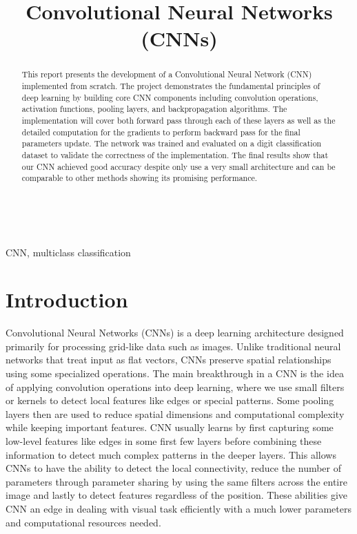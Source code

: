 \documentclass[conference]{IEEEtran}
\begin{document}
\title{Convolutional Neural Networks (CNNs)}\\

\author{
}

\maketitle
\thispagestyle{plain}
\pagestyle{plain}

\begin{abstract}
This report presents the development of a Convolutional Neural Network (CNN) implemented from scratch. The project demonstrates the fundamental principles of deep learning by building core CNN components including convolution operations, activation functions, pooling layers, and backpropagation algorithms. The implementation will cover both forward pass through each of these layers as well as the detailed computation for the gradients to perform backward pass for the final parameters update. The network was trained and evaluated on a digit classification dataset to validate the correctness of the implementation. The final results show that our CNN achieved good accuracy despite only use a very small architecture and can be comparable to other methods showing its promising performance.
\end{abstract}

\begin{IEEEkeywords}
CNN, multiclass classification
\end{IEEEkeywords}

\section{Introduction}
Convolutional Neural Networks (CNNs) is a deep learning architecture designed primarily for processing grid-like data such as images. Unlike traditional neural networks that treat input as flat vectors, CNNs preserve spatial relationships using some specialized operations. The main breakthrough in a CNN is the idea of applying convolution operations into deep learning, where we use small filters or kernels to detect local features like edges or special patterns. Some pooling layers then are used to reduce spatial dimensions and computational complexity while keeping important features. CNN usually learns by first capturing some low-level features like edges in some first few layers before combining these information to detect much complex patterns in the deeper layers. This allows CNNs to have the ability to detect the local connectivity, reduce the number of parameters through parameter sharing by using the same filters across the entire image and lastly to detect features regardless of the position. These abilities give CNN an edge in dealing with visual task efficiently with a much lower parameters and computational resources needed.
\end{document}
